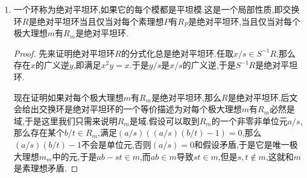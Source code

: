 \begin{enumerate}
\begin{proof}
    	首先取乘性闭子集$S$,先证明$\mathrm{Tor}(S^{-1}M)=S^{-1}(\mathrm{Tor}(M))$.首先右侧包含于左侧是直接的,现在任取左侧的一个元$m/s$,于是存在$r\in R$使得$rm/s=0$,也即存在$t\in S$使得$rtm=0$,于是$m\in\mathrm{Tor}(M)$,于是左侧包含于右侧.
    	
    	现在$M$是无挠模等价于$\mathrm{Tor}(M)=0$,于是按照零模是局部性质,以及分式化和$\mathrm{Tor}$可交换,就得到无挠性是一个局部性质.
    \end{proof}
    \item 一个环称为绝对平坦环,如果它的每个模都是平坦模.这是一个局部性质,即交换环$R$是绝对平坦环当且仅当对每个素理想$P$有$R_P$是绝对平坦环,当且仅当对每个极大理想$m$有$R_m$是绝对平坦环.
    \begin{proof}
    	
    	先来证明绝对平坦环$R$的分式化总是绝对平坦环.任取$x/s\in S^{-1}R$,那么存在$x$的广义逆$y$,即满足$x^2y=x$.于是$y/s$是$x/s$的广义逆,于是$S^{-1}R$是绝对平坦环.
    	
    	现在证明如果对每个极大理想$m$有$R_m$是绝对平坦环,那么$R$是绝对平坦环.后文会给出交换环是绝对平坦环的一个等价描述为对每个极大理想$m$有$R_m$必然是域,于是这里我们只需来说明$R_m$是域.假设可以取到$R_m$的一个非零非单位元$a/s$,那么存在某个$b/t\in R_m$,满足$(a/s)((a/s)(b/t)-1)=0$,那么$(a/s)(b/t)-1$不会是单位元,否则$(a/s)=0$和假设矛盾,于是它是唯一极大理想$m_m$中的元,于是$ab-st\in m$,而$ab\in m$导致$st\in m$,但是$s,t\not\in m$,这就和$m$是素理想矛盾.
    \end{proof}
\end{enumerate}

